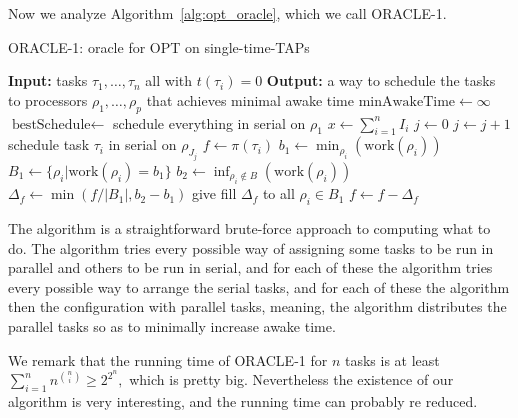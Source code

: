 Now we analyze Algorithm~\ref{alg:opt_oracle}, which we call
ORACLE-1. 

\begin{algorithm}
  \caption{ORACLE-1: oracle for OPT on single-time-TAPs}
  \label{alg:opt_oracle}
  \begin{algorithmic}
    \State \textbf{Input:} tasks $\tau_1,\ldots, \tau_n$ all with $t(\tau_i) = 0$
    \State \textbf{Output:} a way to schedule the tasks to
    processors $\rho_1, \ldots, \rho_p$ that achieves minimal awake time
    \State 
    \State $\text{minAwakeTime} \gets \infty$
    \State $\text{bestSchedule} \gets $ schedule everything in serial on $\rho_1$
      \State $x \gets \sum_{i=1}^n I_i$
        \State $j \gets 0$
            \State $j \gets j+1$
            \State schedule task $\tau_i$ in serial on $\rho_{J_j}$
          \EndIf
        \EndFor
            \State $f \gets \pi(\tau_i)$
              \State $b_1\gets \min_{\rho_i}(\text{work}(\rho_i))$
              \State $B_1 \gets \{\rho_i | \text{work}(\rho_i)=b_1\}$
              \State $b_2\gets \inf_{\rho_i\not\in B}(\text{work}(\rho_i))$
              \State $\Delta_f \gets \min(f/|B_1|, b_2-b_1)$
              \State give fill $\Delta_f$ to all $\rho_i \in B_1$
              \State $f \gets f - \Delta_f$
            \EndWhile
          \EndIf
        \EndFor
        \EndIf
      \EndFor
    \EndFor
  \end{algorithmic}
\end{algorithm}

The algorithm is a straightforward brute-force approach to
computing what to do. The algorithm tries every possible way of
assigning some tasks to be run in parallel and others to be run
in serial, and for each of these the algorithm tries every
possible way to arrange the serial tasks, and for each of these
the algorithm then  the configuration with parallel
tasks, meaning, the algorithm distributes the parallel tasks so
as to minimally increase awake time.

We remark that the running time of ORACLE-1 for $n$ tasks is at
least $\sum_{i=1}^n n^{\binom{n}{i}} \ge 2^{2^n},$ which is
pretty big. Nevertheless the existence of our algorithm is very
interesting, and the running time can probably re reduced.

